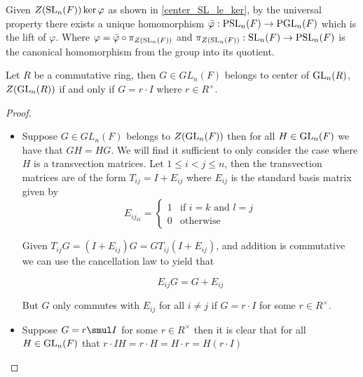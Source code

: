 \begin{definition}
\label{PSL_monoidHom_PGL}
\leanok
    Given $Z(\operatorname{SL}_n(F)) \ker \varphi$ as shown in \ref{center_SL_le_ker}, by the universal property there exists a unique homomorphism $\bar{\varphi} : \operatorname{PSL}_n(F) \rightarrow \operatorname{PGL}_n(F)$ which is the lift of $\varphi$. 
    Where $\varphi = \bar{\varphi} \circ \pi_{Z(\operatorname{SL}_n(F))}$ and $\pi_{Z(\operatorname{SL}_n(F))} : \operatorname{SL}_n(F) \rightarrow \operatorname{PSL}_n(F)$ is the canonical homomorphism from the group into its quotient.
\end{definition}

\begin{lemma}
\label{GeneralLinearGroup.Center.mem_center_general_linear_group_iff}
Let $R$ be a commutative ring, then $G \in GL_n(F)$ belongs to center of $\operatorname{GL}_n(R)$, $Z(\operatorname{GL}_n(R))$ if and only if $G = r \cdot I$ where $r \in R^\times$.
\end{lemma}

\begin{proof}
    \begin{itemize}
    \item Suppose $G \in GL_n(F)$ belongs to $Z(\operatorname{GL}_n(F))$ then for all $H \in \operatorname{GL}_n(F)$ we have that $G H = H G$. We will find it sufficient to only consider the case where $H$ is a transvection matrices.
    Let $1 \leq i < j \leq n$, then the transvection matrices are of the form $T_{ij} = I + E_{ij}$ where $E_{ij}$ is the standard basis matrix given by
    \[
    E_{{ij}_{kl}} = \begin{cases}
    1 & \text{if $i = k$ and $l = j$}\\
    0 & \text{otherwise}
    \end{cases}
    \] 

    Given $T_{ij} G = (I + E_{ij}) G = G T_{ij} (I + E_{ij})$, and addition is commutative we can use the cancellation law to yield that
    
    \[
    E_{ij} G = G + E_{ij}
    \]

    But $G$ only commutes with $E_{ij}$ for all $i \neq j$ if $G = r \cdot I$ for some $r \in R^\times$.
    
    \item Suppose $G = r \smul I$ for some $r \in R^\times$ then it is clear that for all $H \in \operatorname{GL}_n(F)$ that $r \cdot I  H = r \cdot H = H \cdot r = H (r \cdot I)$
    \end{itemize}
\end{proof}

